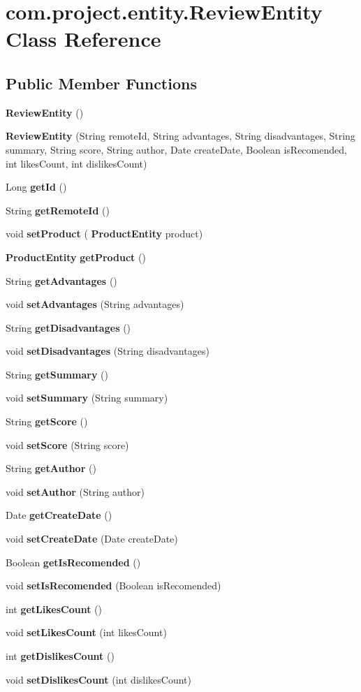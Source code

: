 \section{com.\+project.\+entity.\+Review\+Entity Class Reference}
\label{classcom_1_1project_1_1entity_1_1_review_entity}
\subsection*{Public Member Functions}
\begin{DoxyCompactItemize}
\item 
\textbf{ Review\+Entity} ()
\item 
\textbf{ Review\+Entity} (String remote\+Id, String advantages, String disadvantages, String summary, String score, String author, Date create\+Date, Boolean is\+Recomended, int likes\+Count, int dislikes\+Count)
\item 
Long \textbf{ get\+Id} ()
\item 
String \textbf{ get\+Remote\+Id} ()
\item 
void \textbf{ set\+Product} (\textbf{ Product\+Entity} product)
\item 
\textbf{ Product\+Entity} \textbf{ get\+Product} ()
\item 
String \textbf{ get\+Advantages} ()
\item 
void \textbf{ set\+Advantages} (String advantages)
\item 
String \textbf{ get\+Disadvantages} ()
\item 
void \textbf{ set\+Disadvantages} (String disadvantages)
\item 
String \textbf{ get\+Summary} ()
\item 
void \textbf{ set\+Summary} (String summary)
\item 
String \textbf{ get\+Score} ()
\item 
void \textbf{ set\+Score} (String score)
\item 
String \textbf{ get\+Author} ()
\item 
void \textbf{ set\+Author} (String author)
\item 
Date \textbf{ get\+Create\+Date} ()
\item 
void \textbf{ set\+Create\+Date} (Date create\+Date)
\item 
Boolean \textbf{ get\+Is\+Recomended} ()
\item 
void \textbf{ set\+Is\+Recomended} (Boolean is\+Recomended)
\item 
int \textbf{ get\+Likes\+Count} ()
\item 
void \textbf{ set\+Likes\+Count} (int likes\+Count)
\item 
int \textbf{ get\+Dislikes\+Count} ()
\item 
void \textbf{ set\+Dislikes\+Count} (int dislikes\+Count)
\end{DoxyCompactItemize}


